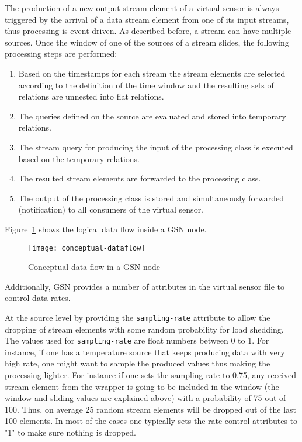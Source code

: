 The production of a new output stream element of a virtual sensor is always triggered
by the arrival of a data stream element from one of its input streams, thus processing is event-driven.
As described before, a stream can have multiple sources. 
Once the window of one of the sources of a stream slides, the 
following processing steps are performed:

\begin{enumerate}
\item Based on the timestamps for each stream the stream elements are
  selected according to the definition of the time window and the resulting
  sets of relations are unnested into flat relations.
\item The queries defined on the source are evaluated and stored into temporary
  relations.
\item The stream query for producing the input of the processing class is executed
  based on the temporary relations.
\item The resulted stream elements are forwarded to the processing class.
\item The output of the processing class is stored and simultaneously forwarded (notification) to
 all consumers of the virtual sensor.
\end{enumerate}

Figure~\ref{fig:ConceptualDataFlow} shows the logical data flow inside
a GSN node.

\begin{figure}%
  \centering
  \texttt{[image: conceptual-dataflow]}
  \caption{Conceptual data flow in a GSN node}
  \label{fig:ConceptualDataFlow}
\end{figure}

Additionally, GSN provides a number of attributes in the virtual sensor file to control data rates.

At the source level by providing the \texttt{sampling-rate} attribute to allow the dropping of stream elements with some random probability for load shedding.
The values used for \texttt{sampling-rate} are float numbers between 0 to 1.
For instance, if one has a temperature source that keeps producing 
data with very high rate, one might want to sample the produced values 
thus making the processing lighter. For instance if one sets the 
sampling-rate to 0.75, any received stream element from the wrapper is going to be 
included in the window (the window and sliding values are explained above) with a probability of 75 out of 100.
Thus, on average 25 random stream elements will be dropped out of the last 100 elements.
In most of the cases one typically sets the rate control attributes to "1" to make sure nothing is dropped.

